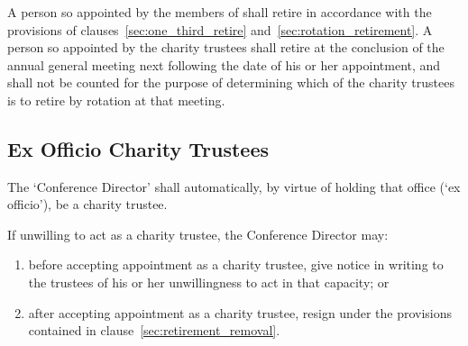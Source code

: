         \subsubsection{}\label{sec:elected_trustee_retirement}
        A person so appointed by the members of \shortname{} shall retire in accordance with the provisions of clauses~\ref{sec:one_third_retire} and~\ref{sec:rotation_retirement}. A person so appointed by the charity trustees shall retire at the conclusion of the annual general meeting next following the date of his or her appointment, and shall not be counted for the purpose of determining which of the charity trustees is to retire by rotation at that meeting.

    \subsection{Ex Officio Charity Trustees}
    The `Conference Director' shall automatically, by virtue of holding that office (`ex officio'), be a charity trustee.

    If unwilling to act as a charity trustee, the Conference Director may:
    \begin{enumerate}
        \item before accepting appointment as a charity trustee, give notice in writing to the trustees of his or her unwillingness to act in that capacity; or
        \item after accepting appointment as a charity trustee, resign under the provisions contained in clause~\ref{sec:retirement_removal}.
    \end{enumerate}
